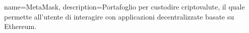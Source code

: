 {
	name={MetaMask},
	description={Portafoglio per custodire criptovalute, il quale permette all'utente di interagire con applicazioni decentralizzate basate su Ethereum.}
}
